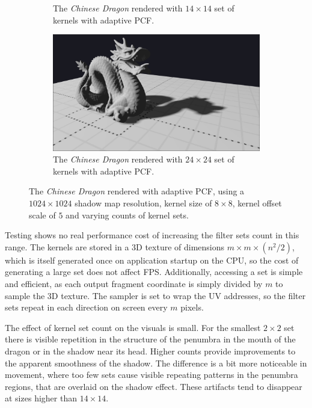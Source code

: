 \begin{figure}[h]
\begin{subfigure}[t]{0.45\textwidth}
        \caption{The \textit{Chinese Dragon} rendered with \(14\times 14\) set of kernels with adaptive PCF.}
    \end{subfigure}
	\hfill
    \begin{subfigure}[t]{0.45\textwidth}
		\centering
        \includegraphics[width=\textwidth]{./graf/tests/adaptive/cropped/dragon_adaptive_fhd_1024_24x24_8x8_offset5.png}
        \caption{The \textit{Chinese Dragon} rendered with \(24\times 24\) set of kernels with adaptive PCF.}
    \end{subfigure}

    \caption{The \textit{Chinese Dragon} rendered with adaptive PCF, using a \(1024\times 1024\) shadow map resolution, kernel size of \(8\times 8\), kernel offset scale of \(5\) and varying counts of kernel sets.}
    \label{fig:test_adaptive_sets_dragon_screens}
\end{figure}

Testing shows no real performance cost of increasing the filter sets count in this range. The kernels are stored in a 3D texture of dimensions \(m\times m \times (n^2/2) \), which is itself generated once on application startup on the CPU, so the cost of generating a large set does not affect FPS. Additionally, accessing a set is simple and efficient, as each output fragment coordinate is simply divided by \(m\) to sample the 3D texture. The sampler is set to wrap the UV addresses, so the filter sets repeat in each direction on screen every \(m\) pixels.

The effect of kernel set count on the visuals is small. For the smallest \(2\times 2\) set there is visible repetition in the structure of the penumbra in the mouth of the dragon or in the shadow near its head. Higher counts provide improvements to the apparent smoothness of the shadow. The difference is a bit more noticeable in movement, where too few sets cause visible repeating patterns in the penumbra regions, that are overlaid on the shadow effect. These artifacts tend to disappear at sizes higher than \(14\times 14\).

